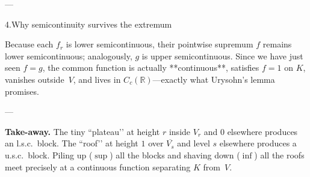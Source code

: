 \documentclass[12pt]{article}
\theoremstyle{definition} %
\theoremstyle{plain} %
\begin{document}
---

4.\;Why semicontinuity survives the extremum

Because each $f_r$ is lower semicontinuous, their pointwise supremum $f$
remains lower semicontinuous; analogously, $g$ is upper semicontinuous.
Since we have just seen \(f=g\), the common function is actually
**continuous**, satisfies $f=1$ on $K$, vanishes outside~$V$, and lives
in $C_c(\mathbb R)$—exactly what Urysohn’s lemma promises.

---

\textbf{Take-away.}  
The tiny “plateau’’ at height $r$ inside $V_r$ and $0$ elsewhere
produces an l.s.c.\ block.  
The “roof’’ at height $1$ over $\overline{V_s}$ and level $s$ elsewhere
produces a u.s.c.\ block.
Piling up (\(\sup\)) all the blocks and shaving down (\(\inf\)) all the
roofs meet precisely at a continuous function separating $K$ from~$V$.
\end{document}
